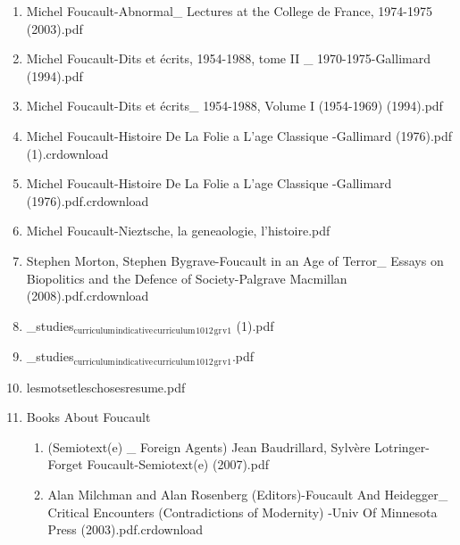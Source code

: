 \documentclass[11pt]{article}
\begin{document}
\begin{enumerate}
\begin{enumerate}
\item Michel Foucault-Abnormal\_ Lectures at the College de France, 1974-1975 (2003).pdf
\label{sec-1-1-1-1-11-29-20-6}

\item Michel Foucault-Dits et écrits, 1954-1988, tome II \_ 1970-1975-Gallimard (1994).pdf
\label{sec-1-1-1-1-11-29-20-7}

\item Michel Foucault-Dits et écrits\_ 1954-1988, Volume I (1954-1969) (1994).pdf
\label{sec-1-1-1-1-11-29-20-8}

\item Michel Foucault-Histoire De La Folie a L'age Classique -Gallimard (1976).pdf (1).crdownload
\label{sec-1-1-1-1-11-29-20-9}

\item Michel Foucault-Histoire De La Folie a L'age Classique -Gallimard (1976).pdf.crdownload
\label{sec-1-1-1-1-11-29-20-10}

\item Michel Foucault-Nieztsche, la geneaologie, l'histoire.pdf
\label{sec-1-1-1-1-11-29-20-11}

\item Stephen Morton, Stephen Bygrave-Foucault in an Age of Terror\_ Essays on Biopolitics and the Defence of Society-Palgrave Macmillan (2008).pdf.crdownload
\label{sec-1-1-1-1-11-29-20-12}

\item \_studies$_{\text{curriculum}}$$_{\text{indicative}}$$_{\text{curriculum}}$$_{\text{1012}}$$_{\text{gr}}$$_{\text{v1}}$ (1).pdf
\label{sec-1-1-1-1-11-29-20-13}

\item \_studies$_{\text{curriculum}}$$_{\text{indicative}}$$_{\text{curriculum}}$$_{\text{1012}}$$_{\text{gr}}$$_{\text{v1}}$.pdf
\label{sec-1-1-1-1-11-29-20-14}

\item lesmotsetleschosesresume.pdf
\label{sec-1-1-1-1-11-29-20-15}

\item Books About Foucault
\label{sec-1-1-1-1-11-29-20-16}
\begin{enumerate}
\item (Semiotext(e) \_ Foreign Agents) Jean Baudrillard, Sylvère Lotringer-Forget Foucault-Semiotext(e) (2007).pdf
\label{sec-1-1-1-1-11-29-20-16-1}

\item Alan Milchman and Alan Rosenberg (Editors)-Foucault And Heidegger\_ Critical Encounters (Contradictions of Modernity)  -Univ Of Minnesota Press (2003).pdf.crdownload
\label{sec-1-1-1-1-11-29-20-16-2}


\end{enumerate}
\end{enumerate}
\end{enumerate}
\end{document}
